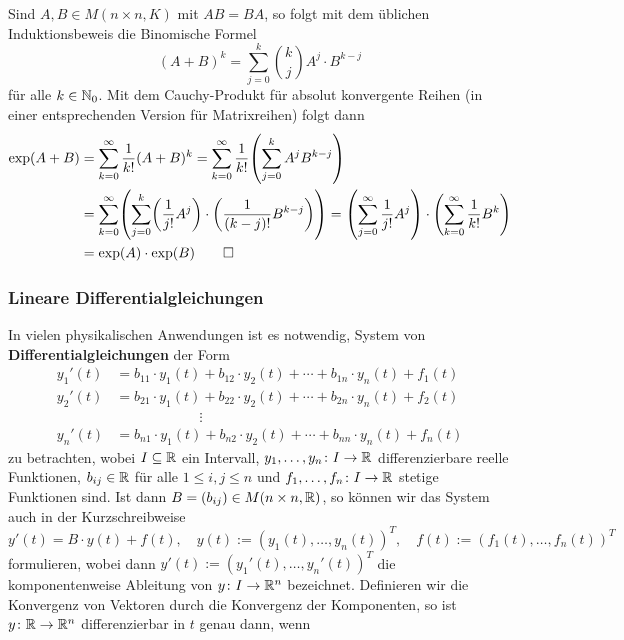 \begin{beweis}[Skizze]
	Sind $A,B \in M(n \times n,K)$ mit $AB = BA$, so folgt mit dem üblichen Induktionsbeweis die Binomische Formel 
	\[
	(A+B)^{k} = \sum_{j=0}^{k} \binom{k}{j} A^{j} \cdot B^{k-j}
		\]
	für alle $k \in \mathbb{N}_0$.
	Mit dem Cauchy-Produkt für absolut konvergente Reihen (in einer entsprechenden Version für Matrixreihen) folgt dann
	\begin{align*}
	\exp(A+B) &= \sum_{k=0}^{\infty} \frac{1}{k!} (A+B)^k = \sum_{k=0}^{\infty} \frac{1}{k!} \enb{\sum_{j=0}^{k} A^{j} B^{k-j}} \\
	&= \sum_{k=0}^{\infty} \enb{\sum_{j=0}^{k} \enb{\frac{1}{j!} A^{j}} \cdot \enb{\frac{1}{(k-j)!} B^{k-j}}} = \enb{\sum_{j=0}^{\infty} \frac{1}{j!} A^{j}} \cdot \enb{\sum_{k=0}^{\infty} \frac{1}{k!} B^{k}} \\
	&= \exp(A) \cdot \exp(B) \qedhere
	\end{align*}
\end{beweis}

\subsubsection*{Lineare Differentialgleichungen}
In vielen physikalischen Anwendungen ist es notwendig, System von \textbf{Differentialgleichungen} der Form 
\begin{align*}
	y_1'(t) &= b_{11} \cdot y_1(t) + b_{12} \cdot y_2(t) + \cdots + b_{1n} \cdot y_n(t) + f_1 (t) \\
	y_2'(t) &= b_{21} \cdot y_1(t) + b_{22} \cdot y_2(t) + \cdots + b_{2n} \cdot y_n(t) + f_2 (t)\\
	& \qquad \qquad \qquad \vdots \\
	y_n'(t) &= b_{n1} \cdot y_1(t) + b_{n2} \cdot y_2(t) + \cdots + b_{nn} \cdot y_n(t) + f_n(t)
\end{align*}
zu betrachten, wobei $I \subseteq \mathbb{R}$ ein Intervall, $y_1,\dots,y_n\colon I \rightarrow \mathbb{R}$ differenzierbare reelle Funktionen, $b_{ij} \in \mathbb{R}$ für alle $1 \leq i,j \leq n$ und $f_1,\dots,f_n \colon I \rightarrow \mathbb{R}$ stetige Funktionen sind.
Ist dann $B = (b_{ij}) \in M(n \times n, \mathbb{R})$, so können wir das System auch in der Kurzschreibweise
\[
	y'(t) = B \cdot y(t) + f(t), \quad y(t) := (y_1(t),\dots,y_n(t))^T, \quad f(t) := (f_1(t),\dots,f_n(t))^T
\]
formulieren, wobei dann $y'(t) := (y_1'(t),\dots,y_n'(t))^T$ die komponentenweise Ableitung von $y\colon I \rightarrow \mathbb{R}^n$ bezeichnet.
Definieren wir die Konvergenz von Vektoren durch die Konvergenz der Komponenten, so ist $y \colon \mathbb{R} \rightarrow \mathbb{R}^n$ differenzierbar in $t$ genau dann, wenn

